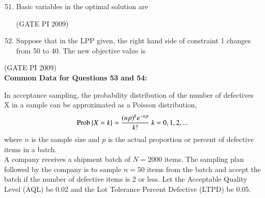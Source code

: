 \documentclass[journal,12pt,onecolumn]{IEEEtran}
\theoremstyle{remark}
\begin{document}
\begin{enumerate}[label=Q.\arabic*, leftmargin=*]
\setcounter{enumi}{50}

\item Basic variables in the optimal solution are
\begin{enumerate}[label=(\Alph*)]
\end{enumerate}
\hfill (GATE PI 2009)
\item Suppose that in the LPP given, the right hand side of constraint 1 changes from 50 to 40. The new objective value is
\begin{enumerate}[label=(\Alph*)]
\end{enumerate}
\end{enumerate}
\hfill (GATE PI 2009) \\
\textbf{Common Data for Questions 53 and 54:}


In acceptance sampling, the probability distribution of the number of defectives X in a sample can be approximated as a Poisson distribution,\\
$$\text{Prob}\left\{X = k\right\}  = \frac{(np)^k e^{-np}}{k!}\ k=0,1,2,...$$
where $n$ is the sample size and $p$ is the actual proportion or percent of defective items in a batch.\\

A company receives a shipment batch of $N = 2000$ items. The sampling plan followed by the company is to sample $n = 50$ items from the batch and accept the batch if the number of defective items is 2 or less. Let the Acceptable Quality Level (AQL) be 0.02 and the Lot Tolerance Percent Defective (LTPD) be 0.05.
\end{document}
